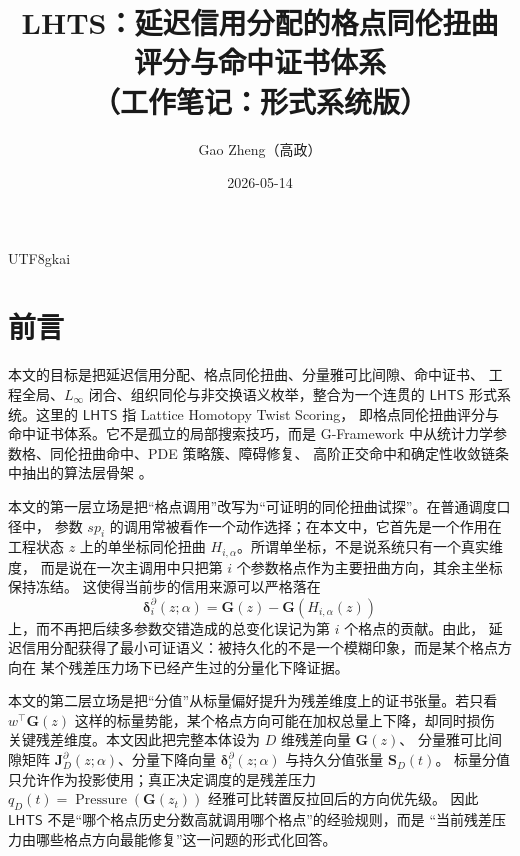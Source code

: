 \documentclass[12pt]{article}
\newcommand{\GFramework}{\textsf{G-Framework}}
\newcommand{\LHTS}{\ensuremath{\mathsf{LHTS}}}
\newcommand{\Linfty}{\ensuremath{L_\infty}}
\DeclareMathOperator{\Pressure}{Pressure}
\begin{document}
\begin{CJK*}{UTF8}{gkai}

\title{LHTS：延迟信用分配的格点同伦扭曲评分与命中证书体系\\（工作笔记：形式系统版）}
\author{Gao Zheng（高政）}
\date{2026-05-14}
\maketitle

\section*{前言}

本文的目标是把延迟信用分配、格点同伦扭曲、分量雅可比间隙、命中证书、
工程全局、\(\Linfty\) 闭合、组织同伦与非交换语义枚举，整合为一个连贯的
\LHTS{} 形式系统。这里的 \LHTS{} 指 Lattice Homotopy Twist Scoring，
即格点同伦扭曲评分与命中证书体系。它不是孤立的局部搜索技巧，而是
\GFramework{} 中从统计力学参数格、同伦扭曲命中、PDE 策略簇、障碍修复、
高阶正交命中和确定性收敛链条中抽出的算法层骨架
\cite{RepoTex53StrategyCluster,RepoTex55PDEParadigm,GaoZheng2025GFramework}。

本文的第一层立场是把“格点调用”改写为“可证明的同伦扭曲试探”。在普通调度口径中，
参数 \(sp_i\) 的调用常被看作一个动作选择；在本文中，它首先是一个作用在工程状态
\(z\) 上的单坐标同伦扭曲 \(H_{i,\alpha}\)。所谓单坐标，不是说系统只有一个真实维度，
而是说在一次主调用中只把第 \(i\) 个参数格点作为主要扭曲方向，其余主坐标保持冻结。
这使得当前步的信用来源可以严格落在
\[
  \boldsymbol\delta_i^\partial(z;\alpha)
  =
  \mathbf G(z)-\mathbf G(H_{i,\alpha}(z))
\]
上，而不再把后续多参数交错造成的总变化误记为第 \(i\) 个格点的贡献。由此，
延迟信用分配获得了最小可证语义：被持久化的不是一个模糊印象，而是某个格点方向在
某个残差压力场下已经产生过的分量化下降证据。

本文的第二层立场是把“分值”从标量偏好提升为残差维度上的证书张量。若只看
\(w^\top\mathbf G(z)\) 这样的标量势能，某个格点方向可能在加权总量上下降，却同时损伤
关键残差维度。本文因此把完整本体设为 \(D\) 维残差向量 \(\mathbf G(z)\)、
分量雅可比间隙矩阵 \(\mathbf J_D^\partial(z;\alpha)\)、分量下降向量
\(\boldsymbol\delta_i^\partial(z;\alpha)\) 与持久分值张量 \(\mathbf S_D(t)\)。
标量分值只允许作为投影使用；真正决定调度的是残差压力
\(q_D(t)=\Pressure(\mathbf G(z_t))\) 经雅可比转置反拉回后的方向优先级。
因此 \LHTS{} 不是“哪个格点历史分数高就调用哪个格点”的经验规则，而是
“当前残差压力由哪些格点方向最能修复”这一问题的形式化回答。


\end{CJK*}
\end{document}

